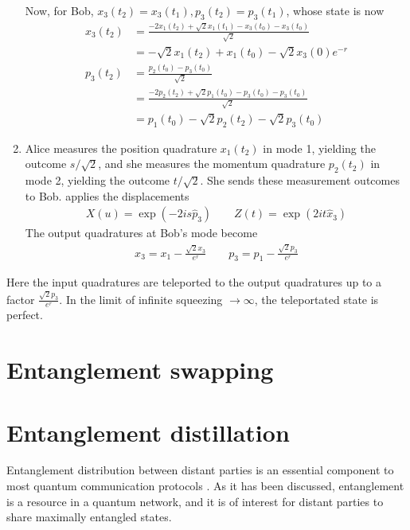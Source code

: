 \documentclass[pra,
superscriptaddress,
 amsmath,amssymb,
 aps,twocolumn]{revtex4-1}
\begin{document}
\begin{enumerate}
\color{blue}
 Now, for Bob, $x_3(t_2) = x_3 (t_1),p_3(t_2) = p_3 (t_1)$, whose state is now
\begin{align}
 x_3 (t_2) &= \frac{-2 x_1(t_2)+ \sqrt 2x_1(t_1) - x_3(t_0) - x_3(t_0)}{\sqrt 2} \nonumber\\
		   &= -\sqrt 2 x_1(t_2 ) + x_1(t_0) - \sqrt 2 x_3(0)e^{-r} \\
p_3 (t_2) &=   \frac{p_2(t_0) - p_3(t_0)}{\sqrt 2} \\
		  &=   \frac{-  2p_2(t_2)  + \sqrt 2 p_1 (t_0) - p_3 (t_0) - p_3(t_0)}{\sqrt 2} \\
		  &=  p_1(t_0)- \sqrt2p_2(t_2) - \sqrt2 p_3 (t_0)
\end{align}

\item Alice measures the position quadrature $x_1(t_2)$ in mode 1, yielding
the outcome $s/\sqrt2$, and she measures the momentum quadrature
$p_2(t_2)$ in mode 2, yielding the outcome $t/\sqrt2$. She sends these measurement outcomes to Bob.
\noindent applies the displacements
\begin{align}
X(u) = \exp(-2 i s \hat p_3) \qquad Z(t) = \exp(2i t \hat x_3)
\end{align}
The output quadratures at Bob's mode become
\begin{align}
x_3 = x_1 -\frac{\sqrt2 x_3}{e^r} \qquad p_3 = p_1 - \frac{\sqrt2 p_3}{e^r}
\end{align}
\end{enumerate}

Here the input quadratures are teleported to the output quadratures up to a factor $\frac{\sqrt2 p_3}{e^r}$. In the limit of infinite squeezing $\rightarrow \infty$, the teleportated state is perfect.



\section{Entanglement swapping}

\section{Entanglement distillation}

Entanglement distribution between distant parties is an essential component to most quantum communication protocols \cite{bib:PhysRevLett.81.5932}. As it has been discussed, entanglement is a resource in a quantum network, and it is of interest for distant parties to share maximally entangled states. 
\end{document}
